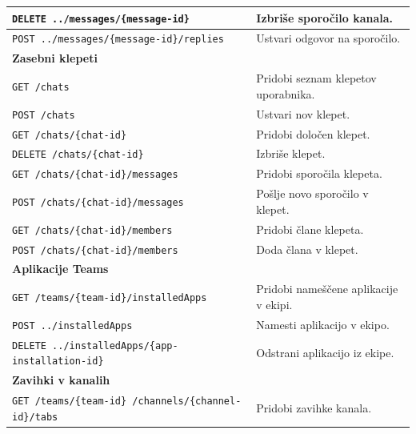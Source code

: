 \documentclass[a4paper, 12pt]{book}
\begin{document}
\begin{longtable}{|p{6cm}|p{8cm}|}
\texttt{DELETE ../messages/\{message-id\}} &
Izbriše sporočilo kanala. \\
\hline

\texttt{POST ../messages/\{message-id\}/replies} &
Ustvari odgovor na sporočilo. \\
\hline

\multicolumn{2}{|l|}{\textbf{Zasebni klepeti}} \\
\hline

\texttt{GET /chats} &
Pridobi seznam klepetov uporabnika. \\
\hline

\texttt{POST /chats} &
Ustvari nov klepet. \\
\hline

\texttt{GET /chats/\{chat-id\}} &
Pridobi določen klepet. \\
\hline

\texttt{DELETE /chats/\{chat-id\}} &
Izbriše klepet. \\
\hline

\texttt{GET /chats/\{chat-id\}/messages} &
Pridobi sporočila klepeta. \\
\hline

\texttt{POST /chats/\{chat-id\}/messages} &
Pošlje novo sporočilo v klepet. \\
\hline

\texttt{GET /chats/\{chat-id\}/members} &
Pridobi člane klepeta. \\
\hline

\texttt{POST /chats/\{chat-id\}/members} &
Doda člana v klepet. \\
\hline

\multicolumn{2}{|l|}{\textbf{Aplikacije Teams}} \\
\hline

\texttt{GET /teams/\{team-id\}/installedApps} &
Pridobi nameščene aplikacije v ekipi. \\
\hline

\texttt{POST ../installedApps} &
Namesti aplikacijo v ekipo. \\
\hline

\texttt{DELETE ../installedApps/\{app-installation-id\}} &
Odstrani aplikacijo iz ekipe. \\
\hline

\multicolumn{2}{|l|}{\textbf{Zavihki v kanalih}} \\
\hline

\texttt{GET /teams/\{team-id\}
/channels/\{channel-id\}/tabs} &
Pridobi zavihke kanala. \\
\hline


\end{longtable}
\end{document}

